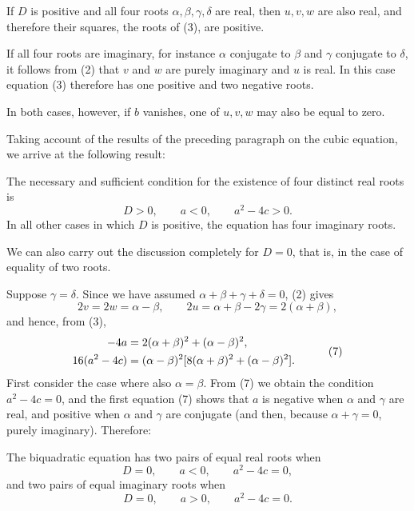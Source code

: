 \documentclass[11pt]{article}
\begin{document}
If $D$ is positive and all four roots $\alpha,\beta,\gamma,\delta$ are real, then $u,v,w$ are also real, and therefore their squares, the roots of (3), are positive.

If all four roots are imaginary, for instance $\alpha$ conjugate to $\beta$ and $\gamma$ conjugate to $\delta$, it follows from (2) that $v$ and $w$ are purely imaginary and $u$ is real. In this case equation (3) therefore has one positive and two negative roots.

In both cases, however, if $b$ vanishes, one of $u,v,w$ may also be equal to zero.

Taking account of the results of the preceding paragraph on the cubic equation, we arrive at the following result:

The necessary and sufficient condition for the existence of four distinct real roots is
\begin{equation}
        D>0,
        \qquad a<0,
        \qquad a^2-4c>0.
\tag{6}
\end{equation}
In all other cases in which $D$ is positive, the equation has four imaginary roots.

We can also carry out the discussion completely for $D=0$, that is, in the case of equality of two roots.

Suppose $\gamma=\delta$. Since we have assumed $\alpha+\beta+\gamma+\delta=0$, (2) gives
\[
        2v=2w=\alpha-\beta,
        \qquad
        2u=\alpha+\beta-2\gamma=2(\alpha+\beta),
\]
and hence, from (3),
\begin{equation}
\begin{aligned}
        -4a&=2(\alpha+\beta)^2+(\alpha-\beta)^2,\cr
        16(a^2-4c)&=(\alpha-\beta)^2[8(\alpha+\beta)^2+(\alpha-\beta)^2].
\end{aligned}
\tag{7}
\end{equation}
First consider the case where also $\alpha=\beta$. From (7) we obtain the condition $a^2-4c=0$, and the first equation (7) shows that $a$ is negative when $\alpha$ and $\gamma$ are real, and positive when $\alpha$ and $\gamma$ are conjugate (and then, because $\alpha+\gamma=0$, purely imaginary). Therefore:

The biquadratic equation has two pairs of equal real roots when
\begin{equation}
        D=0,
        \qquad a<0,
        \qquad a^2-4c=0,
\tag{8}
\end{equation}
and two pairs of equal imaginary roots when
\begin{equation}
        D=0,
        \qquad a>0,
        \qquad a^2-4c=0.
\tag{9}
\end{equation}
\end{document}
